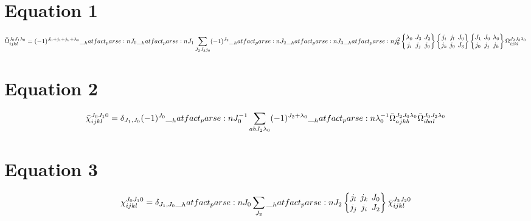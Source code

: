 \documentclass{scrartcl}
\newcommand{\sixj}[6]{\begingroup\setlength{\arraycolsep}{0.2em}\begin{Bmatrix} #1 & #2 & #3 \\ #4 & #5 & #6 \end{Bmatrix}\endgroup}
\begin{document}
\section{Equation 1}
\begin{dmath*}
\bar{\Omega}_{i j k l}^{{J}_{0} {J}_{1} {{\lambda}}_{0}} = (-1)^{{J}_{0}+{j}_{i}+{j}_{k}+{{\lambda}}_{0}} \* \hatfact{{J}_{0}} \* \hatfact{{J}_{1}} \* \sum_{{J}_{2} {J}_{3} {j}_{0}} \* (-1)^{{J}_{2}} \* \hatfact{{J}_{2}} \* \hatfact{{J}_{3}} \* \hatfact{{j}_{0}^{2}} \* \sixj{{{\lambda}}_{0}}{{J}_{3}}{{J}_{2}}{{j}_{i}}{{j}_{j}}{{j}_{0}} \* \sixj{{j}_{i}}{{j}_{l}}{{J}_{0}}{{j}_{k}}{{j}_{0}}{{J}_{3}} \* \sixj{{J}_{1}}{{J}_{0}}{{{\lambda}}_{0}}{{j}_{0}}{{j}_{j}}{{j}_{k}} \* \Omega_{i j k l}^{{J}_{2} {J}_{3} {{\lambda}}_{0}}
\end{dmath*}

\section{Equation 2}
\begin{dmath*}
\bar{\chi}_{i j k l}^{{J}_{0} {J}_{1} 0} = \delta_{{J}_{1},{J}_{0}} \* (-1)^{{J}_{0}} \* \hatfact{{J}_{0}^{-1}} \* \sum_{a b {J}_{2} {{\lambda}}_{0}} \* (-1)^{{J}_{2}+{{\lambda}}_{0}} \* \hatfact{{{\lambda}}_{0}^{-1}} \* \bar{\Omega}_{a j k b}^{{J}_{2} {J}_{0} {{\lambda}}_{0}} \* \bar{\Omega}_{i b a l}^{{J}_{0} {J}_{2} {{\lambda}}_{0}}
\end{dmath*}

\section{Equation 3}
\begin{dmath*}
\chi_{i j k l}^{{J}_{0} {J}_{1} 0} = \delta_{{J}_{1},{J}_{0}} \* \hatfact{{J}_{0}} \* \sum_{{J}_{2}} \* \hatfact{{J}_{2}} \* \sixj{{j}_{l}}{{j}_{k}}{{J}_{0}}{{j}_{j}}{{j}_{i}}{{J}_{2}} \* \bar{\chi}_{i j k l}^{{J}_{2} {J}_{2} 0}
\end{dmath*}
\end{document}
